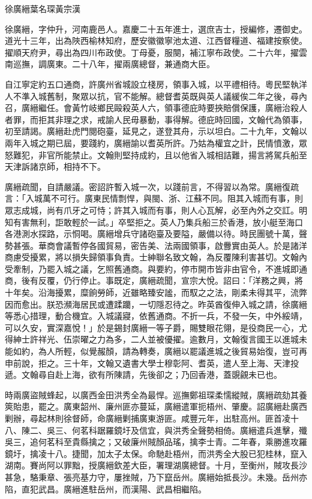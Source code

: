 
\begin{pinyinscope}
徐廣縉葉名琛黃宗漢

徐廣縉，字仲升，河南鹿邑人。嘉慶二十五年進士，選庶吉士，授編修，遷御史。道光十三年，出為陜西榆林知府，歷安徽徽寧池太道、江西督糧道、福建按察使。擢順天府尹，尋出為四川布政使。丁母憂，服闋，補江寧布政使。二十六年，擢雲南巡撫，調廣東。二十八年，擢兩廣總督，兼通商大臣。

自江寧定約五口通商，許廣州省城設立棧房，領事入城，以平禮相待。粵民堅執洋人不準入城舊制，聚眾以抗，官不能解。總督耆英既與英人議緩俟二年之後，尋內召，廣縉繼任。會黃竹岐鄉民毆殺英人六，領事德庇時要挾賠償保護，廣縉治殺人者罪，而拒其非理之求，戒諭人民毋暴動，事得解。德庇時回國，文翰代為領事，初至請謁。廣縉赴虎門閱砲臺，延見之，遂登其舟，示以坦白。二十九年，文翰以兩年入城之期已屆，要踐約，廣縉諭以耆英所許。乃姑為權宜之計，民情憤激，眾怒難犯，非官所能禁止。文翰則堅持成約，且以他省入城相詰難，揚言將駕兵船至天津訴諸京師，相持不下。

廣縉疏聞，自請嚴議。密詔許暫入城一次，以踐前言，不得習以為常。廣縉復疏言：「入城萬不可行。廣東民情剽悍，與閩、浙、江蘇不同。阻其入城而有事，則眾志成城，尚有爪牙之可恃；許其入城而有事，則人心瓦解，必至內外之交訌。明知有害無利，詎敢輕於一試。」卒堅拒之。英人乃集兵船三於香港，放小艇至海口各港測水探路，示恫喝。廣縉增兵守諸砲臺及要隘，嚴備以待。時民團號十萬，聲勢甚張。華商會議暫停各國貿易，密告美、法兩國領事，啟釁實由英人。於是諸洋商慮受擾累，將以損失歸領事負責。士紳聯名致文翰，為反覆陳利害甚切。文翰內受牽制，乃罷入城之議，乞照舊通商。與要約，停市開巿皆非由官令，不進城即通商，後有反覆，仍行停止。事既定，廣縉疏聞，宣宗大悅。詔曰：「洋務之興，將十年矣。沿海擾累，糜餉勞師，近雖略臻安謐，而馭之之法，剛柔未得其平，流弊因而愈出。朕恐瀕海居民或遭蹂躪，一切隱忍待之。昨英酋復伸入城之請，徐廣縉等悉心措理，動合機宜。入城議寢，依舊通商。不折一兵，不發一矢，中外綏靖，可以久安，實深嘉悅！」於是錫封廣縉一等子爵，賜雙眼花翎，是役商民一心，尤得紳士許祥光、伍崇曜之力為多，二人並被優擢。逾數月，文翰復言國王以進城未能如約，為人所輕，似覺赧顏，請為轉奏，廣縉以罷議進城之後貿易始復，豈可再申前說，拒之。三十年，文翰又遺書大學士穆彰阿、耆英，遣人至上海、天津投遞。文翰尋自赴上海，欲有所陳請，先後卻之；乃回香港，蓋覬覦未已也。

時兩廣盜賊蜂起，以廣西金田洪秀全為最悍。巡撫鄭祖琛柔懦縱賊，廣縉疏劾其養筴貽患，罷之。廣東韶州、廉州匪亦蔓延，廣縉遣軍扼梧州、肇慶。詔廣縉赴廣西剿辦，尋起林則徐督師，命廣縉剿捕廣東游匪。咸豐元年，出駐高州。匪首凌十八、陳二、吳三、何茗科踞羅鏡圩及信宜，與洪秀全聲勢相倚。廣縉遣兵進擊，殲吳三，追何茗科至貴縣擒之；又破廉州賊顏品瑤，擒李士青。二年春，乘勝進攻羅鏡圩，擒凌十八。捷聞，加太子太保。命馳赴梧州，而洪秀全大股已犯桂林，竄入湖南。賽尚阿以罪黜，授廣縉欽差大臣，署理湖廣總督。十月，至衡州，賊攻長沙甚急，駱秉章、張亮基力守，屢挫賊，乃下竄岳州。廣縉始抵長沙。未幾。岳州亦陷，直犯武昌。廣縉進駐岳州，而漢陽、武昌相繼陷。


\end{pinyinscope}

